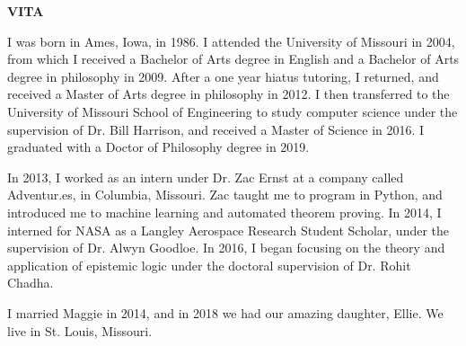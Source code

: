\newpage
{}

\centerline{\bf \large VITA}
\vskip 10mm %

I was born in Ames, Iowa, in 1986. I attended the University of Missouri in 2004, from which I received a Bachelor of Arts degree in English and a Bachelor of Arts degree in philosophy in 2009. After a one year hiatus tutoring, I returned, and received a Master of Arts degree in philosophy in 2012. I then transferred to the University of Missouri School of Engineering to study computer science under the supervision of Dr. Bill Harrison, and received a Master of Science in 2016. I graduated with a Doctor of Philosophy degree in 2019.

In 2013, I worked as an intern under Dr. Zac Ernst at a company called Adventur.es, in Columbia, Missouri. Zac taught me to program in Python, and introduced me to machine learning and automated theorem proving. In 2014, I interned for NASA as a Langley Aerospace Research Student Scholar, under the supervision of Dr. Alwyn Goodloe. In 2016, I began focusing on the theory and application of epistemic logic under the doctoral supervision of Dr. Rohit Chadha.

I married Maggie in 2014, and in 2018 we had our amazing daughter, Ellie. We live in St. Louis, Missouri.
